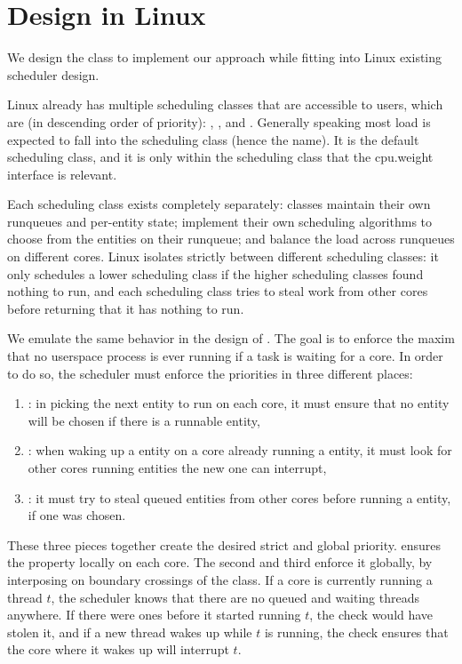 \section{\beclass{} Design in Linux}\label{s:design}

We design the \beclass{} class to implement our approach while fitting into
Linux existing scheduler design.

Linux already has multiple scheduling classes that are accessible to users,
which are (in descending order of priority): \deadlineclass{}, \fifoclass{}, and
\normalclass{}. Generally speaking most load is expected to fall into the
\normalclass{} scheduling class (hence the name). It is the default scheduling
class, and it is only within the \normalclass{} scheduling class that the
\cgroups{} cpu.weight interface is relevant.

Each scheduling class exists completely separately: classes maintain their own
runqueues and per-entity state; implement their own scheduling algorithms to
choose from the entities on their runqueue; and balance the load across
runqueues on different cores. Linux isolates strictly between different
scheduling classes: it only schedules a lower scheduling class if the higher
scheduling classes found nothing to run, and each scheduling class tries to
steal work from other cores before returning that it has nothing to run. 

We emulate the same behavior in the design of \beclass{}. The goal is to enforce
the maxim that no \beclass{} userspace process is ever running if a
\normalclass{} task is waiting for a core. In order to do so, the scheduler must
enforce the priorities in three different places:
\begin{enumerate}
    \item \local: in picking the next entity to run on each core, it must ensure
        that no \beclass{} entity will be chosen if there is a runnable
        \normalclass{} entity,
    \item \entry: when waking up a \normalclass{} entity on a core already
        running a \normalclass{} entity, it must look for other cores running
        \beclass{} entities the new one can interrupt,
    \item \exit: it must try to steal queued \normalclass{} entities from other
        cores before running a \beclass{} entity, if one was chosen.
\end{enumerate}

These three pieces together create the desired strict and global priority.
\local{} ensures the property locally on each core. The second and third enforce
it globally, by interposing on boundary crossings of the \normalclass{} class.
If a core is currently running a \beclass{} thread $t$, the scheduler knows that
there are no queued and waiting \normalclass{} threads anywhere. If there were
ones before it started running $t$, the \exit{} check would have stolen it, and
if a new \normalclass{} thread wakes up while $t$ is running, the \entry{} check
ensures that the core where it wakes up will interrupt $t$.

